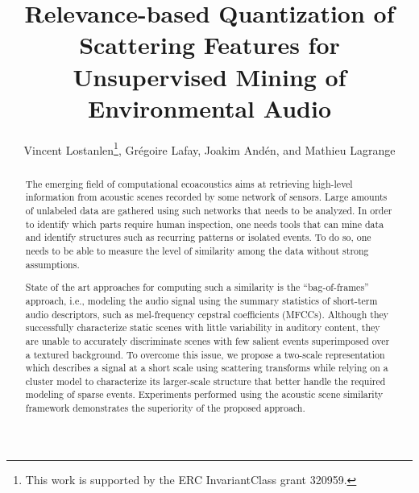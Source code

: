 \documentclass[smallextended]{svjour3}
\begin{document}
%
\title{Relevance-based Quantization of Scattering Features for Unsupervised Mining of Environmental Audio}

\author{Vincent Lostanlen\thanks{This work is supported by the ERC InvariantClass grant 320959.}, Gr\'egoire Lafay, Joakim And\'en, and Mathieu Lagrange}


\maketitle

\begin{abstract}
The emerging field of computational ecoacoustics aims at retrieving high-level information from acoustic scenes recorded by some network of sensors. Large amounts of unlabeled data are gathered using such networks that needs to be analyzed. In order to identify which parts require human inspection, one needs tools that can mine data and identify structures such as recurring patterns or isolated events. To do so, one needs to be able to measure the level of similarity among the data without strong assumptions.

State of the art approaches for computing such a similarity is the ``bag-of-frames'' approach, i.e., modeling the audio signal using the summary statistics of short-term audio descriptors, such as mel-frequency cepstral coefficients (MFCCs).
Although they successfully characterize static scenes with little variability in auditory content, they are unable to accurately discriminate scenes with few salient events superimposed over a textured background.
To overcome this issue, we propose a two-scale representation which describes a signal at a short scale using scattering transforms while relying on a cluster model to characterize its larger-scale structure that better handle the required modeling of sparse events. Experiments performed using the acoustic scene similarity framework demonstrates the superiority of the proposed approach.
\end{abstract}
\end{document}
